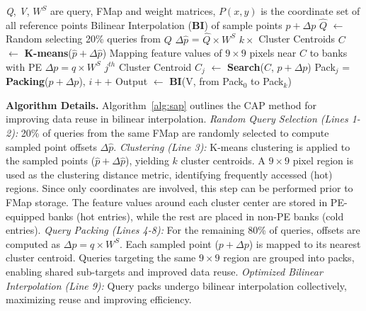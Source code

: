 \documentclass[sigconf]{acmart}
\begin{document}
\begin{algorithm}
\caption{Clustering-and-Packing}\label{alg:sap}
\begin{algorithmic}[1]
\Require \textit{Q}, \textit{V}, $W^{S}$ are query, FMap and weight matrices, 
$P(x,y)$ is the coordinate set of all reference points
\Ensure Bilinear Interpolation (\textbf{BI}) of sample points $p+\Delta p$
\State $\hat{Q}$ $\leftarrow$ Random selecting 20\% queries from $Q$
\State $\Delta\hat{p}$ = $\hat{Q}\times W^S$
\State $k\times$ Cluster Centroids $C$ $\leftarrow$ \textbf{K-means}($\hat{p}+\Delta \hat{p}$)
{\State Mapping feature values of $9\times 9$ pixels near $C$ to banks with PE}
\State $\Delta p = q\times W^S$
\State $j^{th}$ Cluster Centroid $C_j$ $\leftarrow$ \textbf{Search}($C$, $p+ \Delta p$)
\State Pack$_j$ = \textbf{Packing}($p+ \Delta p$), $i++$
\EndWhile
\State Output $\leftarrow$ \textbf{BI}(V, from Pack$_0$ to Pack$_k$)
\end{algorithmic}
\end{algorithm}


\textbf{Algorithm Details.} Algorithm~\ref{alg:sap} outlines the CAP method for improving data reuse in bilinear interpolation. {\textit{Random Query Selection (Lines 1-2):} 20\% of queries from the same FMap are randomly selected to compute sampled point offsets $\Delta\hat{p}$. \textit{Clustering (Line 3):} K-means clustering is applied to the sampled points ($\hat{p} + \Delta\hat{p}$), yielding $k$ cluster centroids. A $9\times9$ pixel region is used as the clustering distance metric, identifying frequently accessed (hot) regions. Since only coordinates are involved, this step can be performed prior to FMap storage. The feature values around each cluster center are stored in PE-equipped banks (hot entries), while the rest are placed in non-PE banks (cold entries). \textit{Query Packing (Lines 4-8):} For the remaining 80\% of queries, offsets are computed as $\Delta p = q \times W^S$. Each sampled point ($p + \Delta p$) is mapped to its nearest cluster centroid. Queries targeting the same $9\times9$ region are grouped into packs, enabling shared sub-targets and improved data reuse. \textit{Optimized Bilinear Interpolation (Line 9):} Query packs undergo bilinear interpolation collectively, maximizing reuse and improving efficiency.}
\end{document}

